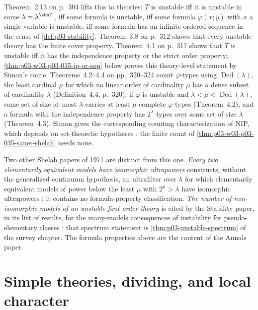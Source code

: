 Theorem~2.13 on p.~304 lifts this to
theories: \(T\) is unstable iff it is unstable in some \(\lambda=\lambda^{\abs
T}\), iff some formula is unstable, iff some formula \(\varphi(x;\bar y)\)
with \(x\) a single variable is unstable, iff some formula has an infinite
ordered sequence in the sense of \cref{def:p03-stability}.  Theorem~3.8 on
p.~312 shows that every unstable theory has the finite cover property.
Theorem~4.1 on p.~317 shows that \(T\) is unstable iff it has the
independence property or the strict order property;
\cref{thm:p03-w03-p03-035-ip-or-sop} below proves this theory-level
statement by Simon's route.  Theorems~4.2--4.4 on pp.~320--324 count
\(\varphi\)-types using \(\operatorname{Ded}(\lambda)\), the least cardinal
\(\mu\) for which no linear order of cardinality \(\mu\) has a dense subset
of cardinality \(\lambda\) (Definition~4.4, p.~320): if \(\varphi\) is
unstable and \(\lambda<\mu<\operatorname{Ded}(\lambda)\), some set of size at
most \(\lambda\) carries at least \(\mu\) complete \(\varphi\)-types
(Theorem~4.2), and a formula with
the independence property has \(2^\lambda\) types over some set of size
\(\lambda\) (Theorem~4.3).  Simon gives the corresponding counting
characterization of NIP, which depends on set-theoretic hypotheses
\cite[Proposition~2.69, p.~35]{Simon2015GuideManuscript}; the finite count of
\cref{thm:p03-w03-p03-035-sauer-shelah} needs none.

Two other Shelah papers of 1971 are distinct from this one.
\emph{Every two elementarily equivalent models have isomorphic ultrapowers}
\cite{Shelah1971Ultrapowers} constructs, without the generalized continuum
hypothesis, an ultrafilter over \(\lambda\) for which elementarily equivalent
models of power below the least \(\mu\) with \(2^\mu>\lambda\) have
isomorphic ultrapowers \cite[p.~224]{Shelah1971Ultrapowers}; it contains no
formula-property classification.  \emph{The number of non-isomorphic models
of an unstable first-order theory} \cite{Shelah1971NonIsomorphicModels} is
cited by the Stability paper, in its list of results, for the many-models
consequences of instability for pseudo-elementary classes
\cite[p.~287, items~G6 and G7]{Shelah1971Stability}; that spectrum statement
is \cref{thm:p03-unstable-spectrum} of the survey chapter.  The formula
properties above are the content of the Annals paper.

\section{Simple theories, dividing, and local character}
\label{sec:p03-w03-p03-035-simple}

